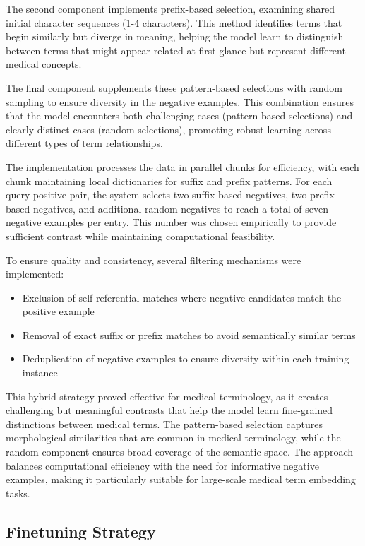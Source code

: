 The second component implements prefix-based selection, examining shared initial character sequences (1-4 characters). This method identifies terms that begin similarly but diverge in meaning, helping the model learn to distinguish between terms that might appear related at first glance but represent different medical concepts.

The final component supplements these pattern-based selections with random sampling to ensure diversity in the negative examples. This combination ensures that the model encounters both challenging cases (pattern-based selections) and clearly distinct cases (random selections), promoting robust learning across different types of term relationships.

The implementation processes the data in parallel chunks for efficiency, with each chunk maintaining local dictionaries for suffix and prefix patterns. For each query-positive pair, the system selects two suffix-based negatives, two prefix-based negatives, and additional random negatives to reach a total of seven negative examples per entry. This number was chosen empirically to provide sufficient contrast while maintaining computational feasibility.

To ensure quality and consistency, several filtering mechanisms were implemented:
\begin{itemize}
    \item Exclusion of self-referential matches where negative candidates match the positive example
    \item Removal of exact suffix or prefix matches to avoid semantically similar terms
    \item Deduplication of negative examples to ensure diversity within each training instance
\end{itemize}

This hybrid strategy proved effective for medical terminology, as it creates challenging but meaningful contrasts that help the model learn fine-grained distinctions between medical terms. The pattern-based selection captures morphological similarities that are common in medical terminology, while the random component ensures broad coverage of the semantic space. The approach balances computational efficiency with the need for informative negative examples, making it particularly suitable for large-scale medical term embedding tasks.

\subsection{Finetuning Strategy}
\label{subsec:finetuning_strategy}

